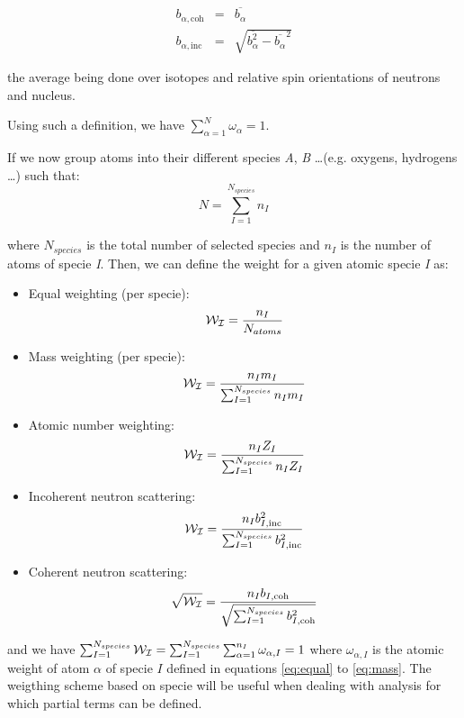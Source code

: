 \documentclass[a4paper,11pt]{report}
\begin{document}
\begin{eqnarray}
b_{\alpha,\mathrm{coh}}&=&\overline{b_\alpha} \\
b_{\alpha,\mathrm{inc}}&=&\sqrt{\overline{b_\alpha^2}-\overline{b_\alpha}^2}
\end{eqnarray} 

the average being done over isotopes and relative spin orientations of neutrons and nucleus. 

Using such a definition, we have $\sum_{\alpha=1}^N \omega_\alpha=1$.

If we now group atoms into their different species \textit{A}, \textit{B} \ldots (e.g. oxygens, hydrogens \ldots ) such that:
\begin{equation}
N = \sum^{N_{species}}_{I = 1}n_I
\end{equation}

where $N_{species}$ is the total number of selected species and $n_I$ is the number of atoms of specie \textit{I}. Then, we can 
define the weight for a given atomic specie \textit{I} as:

\begin{itemize}
\item Equal weighting (per specie):
\begin{equation}
\label{eq:equal_specie}
{\cal W_I}=\frac{n_I}{N_{atoms}}
\end{equation}
\item Mass weighting (per specie): 
\begin{equation}
\label{eq:mass_specie}
{\cal W_I}=\frac{n_{I}m_{I}}{\sum^{N_{species}}_{I=1} n_{I}m_{I}}
\end{equation}
\item Atomic number weighting: 
\begin{equation}
\label{eq:atomic_number_specie}
{\cal W_I}=\frac{n_{I}Z_{I}}{\sum^{N_{species}}_{I=1} n_{I}Z_{I}}
\end{equation}
\item Incoherent neutron scattering: 
\begin{equation}
\label{eq:incoherent_specie}
{\cal W_I}=\frac{n_{I}b_{I,\mathrm{inc}}^2}{\sum^{N_{species}}_{I=1} b_{I,\mathrm{inc}}^2}
\end{equation}
\item Coherent neutron scattering: 
\begin{equation}
\label{eq:coherent_specie}
\sqrt{{\cal W_I}}=\frac{n_{I}b_{I,\mathrm{coh}}}{\sqrt{\sum^{N_{species}}_{I=1} b_{I,\mathrm{coh}}^2}}
\end{equation}
\end{itemize}
and we have $\sum_{I=1}^{N_{species}} {\cal W_I}=\sum_{I=1}^{N_{species}}\sum_{\alpha=1}^{n_I} \omega_{\alpha,I}= 1$ where 
$\omega_{\alpha,I}$ is the atomic weight of atom $\alpha$ of specie $I$ defined in equations 
\ref{eq:equal} to \ref{eq:mass}. The weigthing scheme based on specie will be useful when dealing with analysis for which 
partial terms can be defined.
\end{document}
